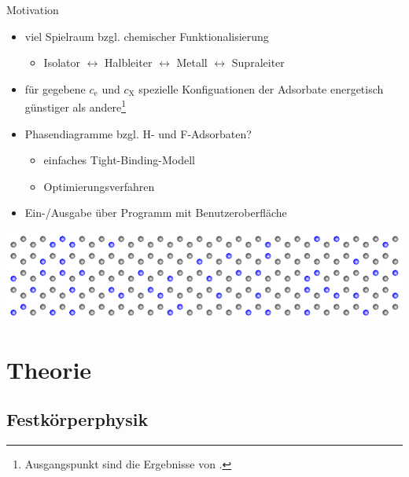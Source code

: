 \documentclass{beamer}
\def \cE {c_\mathrm{e}}
\def \cX {c_\mathrm{X}}
\begin{document}
	\begin{frame}{Motivation}
		\begin{itemize}
			\item viel Spielraum bzgl. chemischer Funktionalisierung
			\begin{itemize}
				\item Isolator $\leftrightarrow$ Halbleiter $\leftrightarrow$ Metall $\leftrightarrow$ Supraleiter
			\end{itemize}
			\item für gegebene $\cE$ und $\cX$ spezielle Konfiguationen der Adsorbate energetisch günstiger als andere\footnote{Ausgangspunkt sind die Ergebnisse von \cite{Wehling}.}
			\item Phasendiagramme bzgl. H- und F-Adsorbaten?
			\begin{itemize}
				\item einfaches Tight-Binding-Modell
				\item Optimierungsverfahren
			\end{itemize}
			\item Ein-/Ausgabe über Programm mit Benutzeroberfläche
		\end{itemize}
		\includegraphics[width=\textwidth]{Abbildungen/motivation.pdf}
	\end{frame}

	\section{Theorie}
	
	\subsection{Festkörperphysik}
	
\end{document}
